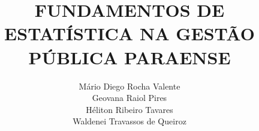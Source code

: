

\title{FUNDAMENTOS DE ESTATÍSTICA NA GESTÃO PÚBLICA PARAENSE} 



\author{Mário Diego Rocha Valente  \\  Geovana Raiol Pires \\ Héliton Ribeiro Tavares \\ Waldenei Travassos de Queiroz }
\renewcommand{\lsISBNdigital}{000-0-000000-00-0}
\renewcommand{\lsISBNhardcover}{000-0-000000-00-0}
\renewcommand{\lsISBNsoftcover}{000-0-000000-00-0}
\renewcommand{\lsISBNsoftcoverus}{000-0-000000-00-0}
\renewcommand{\lsSeries}{cfls} %
\renewcommand{\lsSeriesNumber}{99} %


\setlength{\csspine}{25.0559784mm} %
\setlength{\bodspine}{20mm} %
